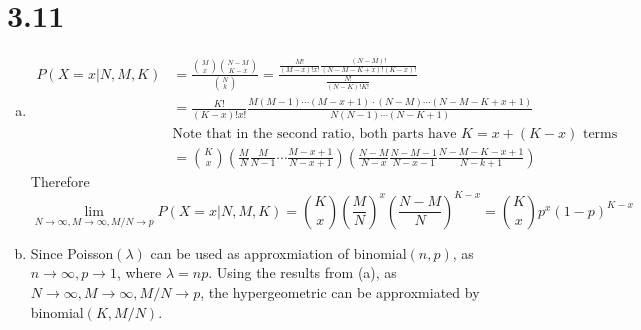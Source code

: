 \documentclass[letter]{article}
\begin{document}
    \section*{3.11}
    \begin{enumerate}[(a)]
    \item 
    \begin{align*}
    P(X=x|N,M,K) & = \frac{\binom{M}{x} \binom{N-M}{K-x}}{\binom{N}{k}} 
    = \frac{\frac{M!}{(M-x)!x!} \frac{(N-M)!}{(N-M-K+x)!(K-x)!}}{\frac{N!}{(N-K)!K!}} \\
    & = \frac{K!}{(K-x)!x!} \frac{M(M-1)\cdots(M-x+1) \cdot (N-M) \cdots (N-M-K+x+1)}{N(N-1)\cdots(N-K+1)}\\
    & \text{Note that in the second ratio, both parts have $K = x + (K-x)$ terms}\\
    & = \binom{K}{x} \left(\frac{M}{N} \frac{M}{N-1} \cdots \frac{M-x+1}{N-x+1} \right) \left(\frac{N-M}{N-x} \frac{N-M-1}{N-x-1} \frac{N-M-K-x+1}{N-k+1} \right)
    \end{align*}
    Therefore
    \[
    \lim_{N \to \infty, M \to \infty, M/N \to p} P(X=x|N,M,K) = \binom{K}{x} \left(\frac{M}{N}\right)^x \left(\frac{N-M}{N}\right)^{K-x} = \binom{K}{x} p^x (1-p)^{K-x}
    \]

    \item Since Poisson$(\lambda)$ can be used as approxmiation of binomial$(n, p)$, as $n \to \infty, p \to 1$, where $\lambda = np$. Using the results from (a), as $N\to\infty, M\to\infty, M/N\to p$, 
    the hypergeometric can be approxmiated by binomial$(K, M/N)$.


\end{enumerate}
\end{document}
